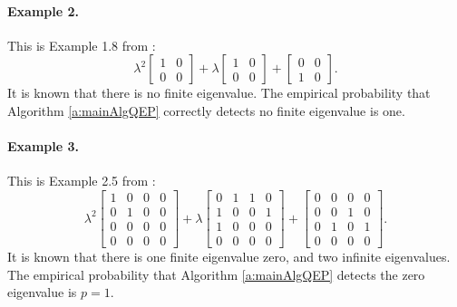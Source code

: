 \documentclass[12pt]{article}
\begin{document}
\paragraph{Example 2.}
This is Example 1.8 from \cite{byers2008trimmed}:
\begin{equation*}
    \lambda^2 \begin{bmatrix}
        1 & 0\\
        0 & 0
    \end{bmatrix} + \lambda \begin{bmatrix}
        1 & 0\\
        0 & 0
    \end{bmatrix} + \begin{bmatrix}
        0 & 0\\
        1 & 0
    \end{bmatrix}.
\end{equation*}
It is known that there is no finite eigenvalue. The empirical probability that Algorithm \ref{a:mainAlgQEP} correctly detects no finite eigenvalue is one.
\paragraph{Example 3.}
This is Example 2.5 from \cite{byers2008trimmed}:
\begin{equation*}
    \lambda^2\begin{bmatrix}
        1 & 0 & 0 & 0\\
        0 & 1 & 0 & 0\\
        0 & 0 & 0 & 0\\
        0 & 0 & 0 & 0
    \end{bmatrix} + \lambda \begin{bmatrix}
        0 & 1 & 1 & 0\\
        1 & 0 & 0 & 1\\
        1 & 0 & 0 & 0\\
        0 & 0 & 0 & 0
    \end{bmatrix} + \begin{bmatrix}
        0 & 0 & 0 & 0\\
        0 & 0 & 1 & 0\\
        0 & 1 & 0 & 1\\
        0 & 0 & 0 & 0
    \end{bmatrix}.
\end{equation*}
It is known that there is one finite eigenvalue zero, and two infinite eigenvalues. The empirical probability that Algorithm \ref{a:mainAlgQEP} detects the zero eigenvalue is $p = 1$.
\end{document}
